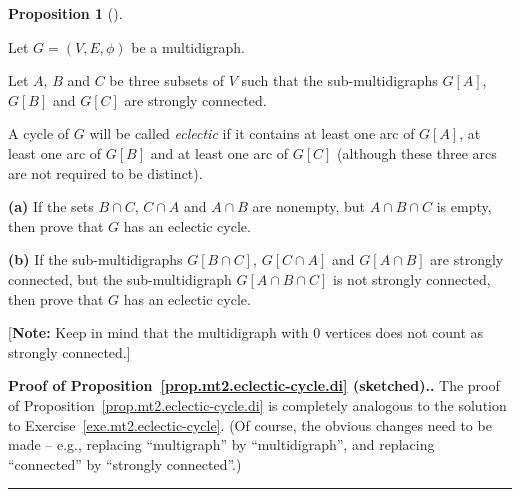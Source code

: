 \documentclass[numbers=enddot,12pt,final,onecolumn,notitlepage]{scrartcl}%
\theoremstyle{definition}
\newtheorem{prop}[theo]{Proposition}
\newenvironment{proposition}[1][]
{\begin{prop}[#1]\begin{leftbar}}
{\end{leftbar}\end{prop}}
\newenvironment{proof}[1][Proof]{\noindent\textbf{#1.} }{\ \rule{0.5em}{0.5em}}
\newcommand{\tup}[1]{\left( #1 \right)}
\newcommand{\ive}[1]{\left[ #1 \right]}
\begin{document}
\begin{proposition} \label{prop.mt2.eclectic-cycle.di}
Let $G = \tup{V, E, \phi}$ be a multidigraph.

Let $A$, $B$ and $C$ be three subsets of $V$ such that the
sub-multidigraphs $G \ive{A}$, $G \ive{B}$ and $G \ive{C}$ are
strongly connected.

A cycle of $G$ will be called \textit{eclectic} if it contains at
least one arc of $G \ive{A}$, at least one arc of $G \ive{B}$ and
at least one arc of $G \ive{C}$ (although these three arcs are not
required to be distinct).

\textbf{(a)} If the sets $B \cap C$, $C \cap A$ and $A \cap B$ are
nonempty, but $A \cap B \cap C$ is empty, then prove that $G$ has an
eclectic cycle.

\textbf{(b)} If the sub-multidigraphs
$G \ive{B \cap C}$, $G \ive{C \cap A}$ and $G \ive{A \cap B}$ are
strongly connected, but the sub-multidigraph
$G \ive{A \cap B \cap C}$ is not strongly connected, then prove that
$G$ has an eclectic cycle.

[\textbf{Note:} Keep in mind that the multidigraph with $0$ vertices
does not count as strongly connected.]
\end{proposition}

\begin{proof}[Proof of Proposition~\ref{prop.mt2.eclectic-cycle.di}
(sketched).]
The proof of Proposition~\ref{prop.mt2.eclectic-cycle.di} is
completely analogous to the
solution to Exercise~\ref{exe.mt2.eclectic-cycle}.
(Of course, the obvious changes need to be made -- e.g., replacing
``multigraph'' by ``multidigraph'', and replacing
``connected'' by ``strongly connected''.)
\end{proof}
\end{document}
